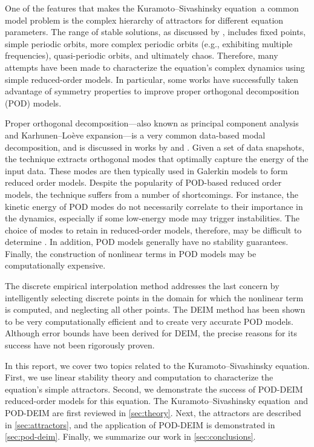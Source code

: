 \documentclass[11pt]{article}
\newcommand{\KSE}{Kuramoto--Sivashinsky equation}
\begin{document}
One of the features that makes the \KSE\ a common model problem is the complex hierarchy of attractors for different equation parameters.
The range of stable solutions, as discussed by \cite{KevrekidisSIAMJAM90}, includes fixed points, simple periodic orbits, more complex periodic orbits (e.g., exhibiting multiple frequencies), quasi-periodic orbits, and ultimately chaos.
Therefore, many attempts have been made to characterize the equation's complex dynamics using simple reduced-order models.
In particular, some works \citep[e.g.,][]{AubrySIAMJSC93, RowleyPD00} have successfully taken advantage of symmetry properties to improve proper orthogonal decomposition (POD) models.

Proper orthogonal decomposition---also known as principal component analysis and Karhunen--Lo\`eve expansion---is a very common data-based modal decomposition, and is discussed in works by \cite{SirovichQAM87} and \cite{HolmesTCSDSS}.
Given a set of data snapshots, the technique extracts orthogonal modes that optimally capture the energy of the input data.
These modes are then typically used in Galerkin models to form reduced order models.
Despite the popularity of POD-based reduced order models, the technique suffers from a number of shortcomings.
For instance, the kinetic energy of POD modes do not necessarily correlate to their importance in the dynamics, especially if some low-energy mode may trigger instabilities.
The choice of modes to retain in reduced-order models, therefore, may be difficult to determine \citep[see, e.g.,][]{IlakPF08}.
In addition, POD models generally have no stability guarantees.
Finally, the construction of nonlinear terms in POD models may be computationally expensive.

The discrete empirical interpolation method \citep[DEIM;][]{ChaturantabutIEEECDC09, ChaturantabutRice09a} addresses the last concern by intelligently selecting discrete points in the domain for which the nonlinear term is computed, and neglecting all other points.
The DEIM method has been shown to be very computationally efficient and to create very accurate POD models.
Although error bounds have been derived for DEIM, the precise reasons for its success have not been rigorously proven.

In this report, we cover two topics related to the \KSE.
First, we use linear stability theory and computation to characterize the equation's simple attractors.
Second, we demonstrate the success of POD-DEIM reduced-order models for this equation.
The \KSE\ and POD-DEIM are first reviewed in \autoref{sec:theory}.
Next, the attractors are described in \autoref{sec:attractors}, and the application of POD-DEIM is demonstrated in \autoref{sec:pod-deim}.
Finally, we summarize our work in \autoref{sec:conclusions}.
\end{document}
